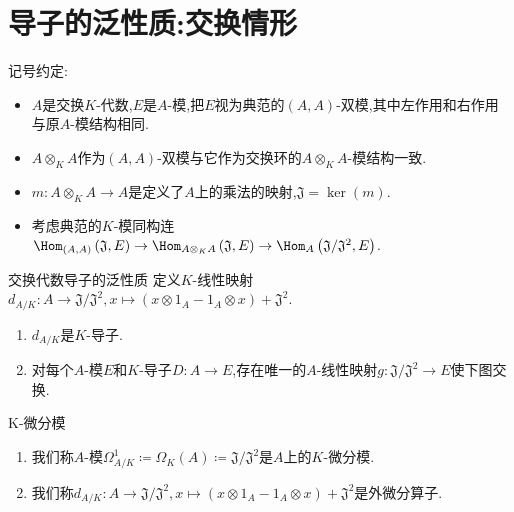 \section{导子的泛性质:交换情形}

记号约定:
\begin{itemize}
	\item $A$是交换$K$-代数,$E$是$A$-模,把$E$视为典范的$\left(A,A\right)$-双模,其中左作用和右作用与原$A$-模结构相同.
	\item $A\otimes_{K}A$作为$\left(A,A\right)$-双模与它作为交换环的$A\otimes_{K}A$-模结构一致.
	\item $m:A\otimes_{K}A\to A$是定义了$A$上的乘法的映射,$\mathfrak{J}=\ker\left(m\right)$.
	\item 考虑典范的$K$-模同构连$\Hom_{\left(A,A\right)}\left(\mathfrak{J},E\right)\to\Hom_{A\otimes_{K}A}\left(\mathfrak{J},E\right)\to\Hom_{A}\left(\mathfrak{J}/\mathfrak{J}^{2},E\right)$.
\end{itemize}

\begin{proposition}{交换代数导子的泛性质}{}
	定义$K$-线性映射$d_{A/K}:A\to\mathfrak{J}/\mathfrak{J}^{2},x\mapsto\left(x\otimes 1_{A}-1_{A}\otimes x\right)+\mathfrak{J}^{2}$.
	\begin{enumerate}
		\item $d_{A/K}$是$K$-导子.
		\item 对每个$A$-模$E$和$K$-导子$D:A\to E$,存在唯一的$A$-线性映射$g:\mathfrak{J}/\mathfrak{J}^{2}\to E$使下图交换.
		\begin{center}
		\end{center}
	\end{enumerate}
\end{proposition}

\begin{definition}{K-微分模}{}
	\begin{enumerate}
		\item 我们称$A$-模$\Omega_{A/K}^{1}\coloneq\Omega_{K}\left(A\right)\coloneq\mathfrak{J}/\mathfrak{J}^{2}$是$A$上的$K$-微分模.
		\item 我们称$d_{A/K}:A\to\mathfrak{J}/\mathfrak{J}^{2},x\mapsto\left(x\otimes 1_{A}-1_{A}\otimes x\right)+\mathfrak{J}^{2}$是外微分算子.
	\end{enumerate}
\end{definition}

